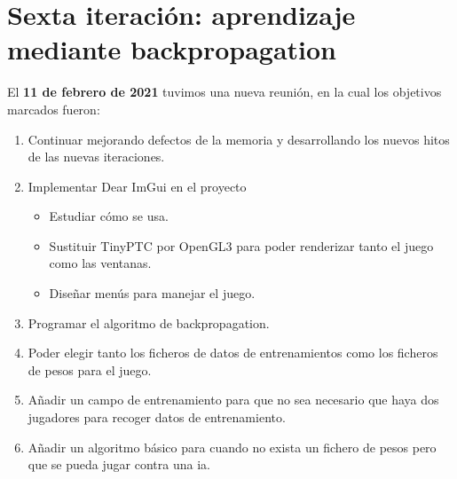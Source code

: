 \section{Sexta iteración: aprendizaje mediante backpropagation}
\label{sexta iteracion}
El \textbf{11 de febrero de 2021} tuvimos una nueva reunión, en la cual los objetivos marcados fueron:
\begin{enumerate}
	\item Continuar mejorando defectos de la memoria y desarrollando los nuevos hitos de las nuevas iteraciones.
	\item Implementar Dear ImGui en el proyecto
	\begin{itemize}
		\item Estudiar cómo se usa.
		\item Sustituir TinyPTC por OpenGL3 para poder renderizar tanto el juego como las ventanas.
		\item Diseñar menús para manejar el juego.
	\end{itemize}
	\item Programar el algoritmo de backpropagation.
	\item Poder elegir tanto los ficheros de datos de entrenamientos como los ficheros de pesos para el juego.
	\item Añadir un campo de entrenamiento para que no sea necesario que haya dos jugadores para recoger datos de entrenamiento.
	\item Añadir un algoritmo básico para cuando no exista un fichero de pesos pero que se pueda jugar contra una \gls{ia}.
\end{enumerate}


